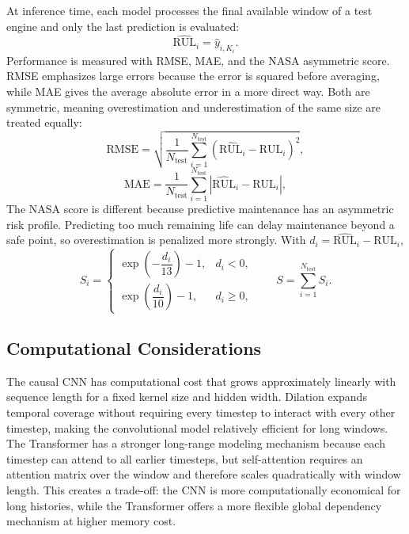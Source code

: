 \documentclass[11pt,a4paper]{article}
\begin{document}
At inference time, each model processes the final available window of a test engine and only the last prediction is evaluated:
\begin{equation}
    \widehat{\mathrm{RUL}}_i = \hat{y}_{i,K_i}.
\end{equation}
Performance is measured with RMSE, MAE, and the NASA asymmetric score. RMSE emphasizes large errors because the error is squared before averaging, while MAE gives the average absolute error in a more direct way. Both are symmetric, meaning overestimation and underestimation of the same size are treated equally:
\begin{equation}
    \mathrm{RMSE}
    =
    \sqrt{
        \frac{1}{N_{\mathrm{test}}}
        \sum_{i=1}^{N_{\mathrm{test}}}
        \left(\widehat{\mathrm{RUL}}_i-\mathrm{RUL}_i\right)^2
    },
\end{equation}
\begin{equation}
    \mathrm{MAE}
    =
    \frac{1}{N_{\mathrm{test}}}
    \sum_{i=1}^{N_{\mathrm{test}}}
    \left|
        \widehat{\mathrm{RUL}}_i-\mathrm{RUL}_i
    \right|,
\end{equation}
The NASA score is different because predictive maintenance has an asymmetric risk profile. Predicting too much remaining life can delay maintenance beyond a safe point, so overestimation is penalized more strongly. With $d_i=\widehat{\mathrm{RUL}}_i-\mathrm{RUL}_i$,
\begin{equation}
    S_i =
    \begin{cases}
        \exp\left(-\dfrac{d_i}{13}\right)-1, & d_i < 0,\\[6pt]
        \exp\left(\dfrac{d_i}{10}\right)-1, & d_i \geq 0,
    \end{cases}
    \qquad
    S = \sum_{i=1}^{N_{\mathrm{test}}} S_i.
\end{equation}

\subsection{Computational Considerations}

The causal CNN has computational cost that grows approximately linearly with sequence length for a fixed kernel size and hidden width. Dilation expands temporal coverage without requiring every timestep to interact with every other timestep, making the convolutional model relatively efficient for long windows. The Transformer has a stronger long-range modeling mechanism because each timestep can attend to all earlier timesteps, but self-attention requires an attention matrix over the window and therefore scales quadratically with window length. This creates a trade-off: the CNN is more computationally economical for long histories, while the Transformer offers a more flexible global dependency mechanism at higher memory cost.
\end{document}
